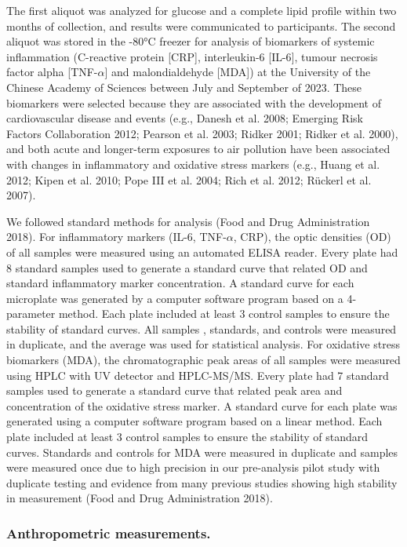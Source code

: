 \documentclass[
  letterpaper,
  DIV=11,
  numbers=noendperiod]{scrartcl}
\begin{document}
The first aliquot was analyzed for glucose and a complete lipid profile
within two months of collection, and results were communicated to
participants. The second aliquot was stored in the -80°C freezer for
analysis of biomarkers of systemic inflammation (C-reactive protein
{[}CRP{]}, interleukin-6 {[}IL-6{]}, tumour necrosis factor alpha
{[}TNF-\(\alpha\){]} and malondialdehyde {[}MDA{]}) at the University of
the Chinese Academy of Sciences between July and September of 2023.
These biomarkers were selected because they are associated with the
development of cardiovascular disease and events (e.g., Danesh et al.
2008; Emerging Risk Factors Collaboration 2012; Pearson et al. 2003;
Ridker 2001; Ridker et al. 2000), and both acute and longer-term
exposures to air pollution have been associated with changes in
inflammatory and oxidative stress markers (e.g., Huang et al. 2012;
Kipen et al. 2010; Pope III et al. 2004; Rich et al. 2012; Rückerl et
al. 2007).

We followed standard methods for analysis (Food and Drug Administration
2018). For inflammatory markers (IL-6, TNF-\(\alpha\), CRP), the optic
densities (OD) of all samples were measured using an automated ELISA
reader. Every plate had 8 standard samples used to generate a standard
curve that related OD and standard inflammatory marker concentration. A
standard curve for each microplate was generated by a computer software
program based on a 4-parameter method. Each plate included at least 3
control samples to ensure the stability of standard curves. All samples
, standards, and controls were measured in duplicate, and
the average was used for statistical analysis. For oxidative stress
biomarkers (MDA), the chromatographic peak areas of all samples were
measured using HPLC with UV detector and HPLC-MS/MS. Every plate had 7
standard samples used to generate a standard curve that related peak
area and concentration of the oxidative stress marker. A standard curve
for each plate was generated using a computer software program based on
a linear method. Each plate included at least 3 control samples to
ensure the stability of standard curves. Standards and controls for MDA
were measured in duplicate and samples were measured once due to high
precision in our  pre-analysis pilot study with duplicate
testing and evidence from many previous studies showing high stability
in measurement (Food and Drug Administration 2018).

\subsubsection{Anthropometric
measurements.}\label{anthropometric-measurements.}
\end{document}
